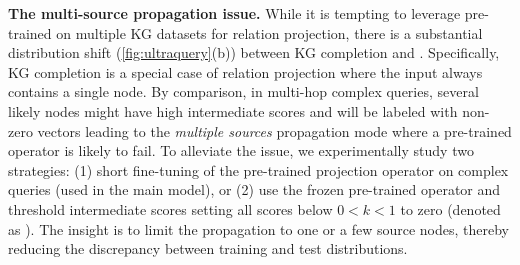 \textbf{The multi-source propagation issue.}
While it is tempting to leverage \ultra pre-trained on multiple KG datasets for relation projection, there is a substantial distribution shift (\autoref{fig:ultraquery}(b)) between KG completion and \clqa. Specifically, KG completion is a special case of relation projection where the input always contains a single node.
By comparison, in multi-hop complex queries, several likely nodes might have high intermediate scores and will be labeled with non-zero vectors leading to the \emph{multiple sources} %
propagation mode where a pre-trained operator is likely to fail.
To alleviate the issue, we experimentally study two strategies: (1) short fine-tuning  of the pre-trained projection operator on complex queries (used in the main \method model), or (2) use the frozen pre-trained operator and threshold intermediate scores setting all scores below $0 < k < 1$ to zero (denoted as \methodlp). The insight is to limit the propagation to one or a few source nodes, thereby reducing the discrepancy between training and test distributions.



